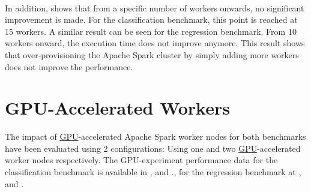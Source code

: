 \paragraph{}
In addition,  shows that from a specific number of workers onwards, no significant improvement is made.
For the classification benchmark, this point is reached at 15 workers.
A similar result can be seen for the regression benchmark. From 10 workers onward, the execution time does not improve anymore.
This result shows that over-provisioning the Apache Spark cluster by simply adding more workers does not improve the performance.


\section{GPU-Accelerated Workers}
\label{sec:07_gpu}
The impact of \hyperlink{abbr:gpu}{GPU}-accelerated Apache Spark worker nodes for both benchmarks have been evaluated using 2 configurations: Using one and two \hyperlink{abbr:gpu}{GPU}-accelerated worker nodes respectively.
%
The GPU-experiment performance data for the classification benchmark is available in , and ., for the regression benchmark at , and .


